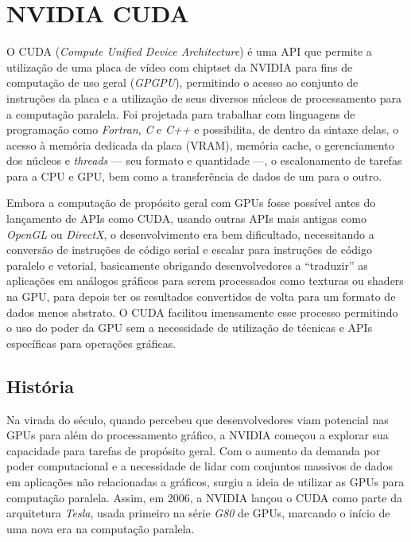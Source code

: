 \documentclass[12pt,
openright, 
oneside, %
a4paper,    %
brazil]{facom-ufu-abntex2}
\begin{document}

\section{NVIDIA CUDA}
\label{sec:cuda}

O CUDA (\textit{Compute Unified Device Architecture}) é uma API que permite a utilização de uma placa de vídeo com chiptset da NVIDIA para fins de computação de uso geral (\textit{GPGPU}), permitindo o acesso ao conjunto de instruções da placa e a utilização de seus diversos núcleos de processamento para a computação paralela. Foi projetada para trabalhar com linguagens de programação como \textit{Fortran}, \textit{C} e \textit{C++} e possibilita, de dentro da sintaxe delas, o acesso à memória dedicada da placa (VRAM), memória cache, o gerenciamento dos núcleos e \textit{threads} --- seu formato e quantidade ---, o escalonamento de tarefas para a CPU e GPU, bem como a transferência de dados de um para o outro.

Embora a computação de propósito geral com GPUs fosse possível antes do lançamento de APIs como CUDA, usando outras APIs mais antigas como \textit{OpenGL} ou \textit{DirectX}, o desenvolvimento era bem dificultado, necessitando a conversão de instruções de código serial e escalar para instruções de código paralelo e vetorial, basicamente obrigando desenvolvedores a \enquote{traduzir} as aplicações em análogos gráficos para serem processados como texturas ou shaders na GPU, para depois ter os resultados convertidos de volta para um formato de dados menos abstrato. O CUDA facilitou imensamente esse processo permitindo o uso do poder da GPU sem a necessidade de utilização de técnicas e APIs específicas para operações gráficas.


\subsection{História}
\label{ssc:históriaCUDA}

Na virada do século, quando percebeu que desenvolvedores viam potencial nas GPUs para além do processamento gráfico, a NVIDIA começou a explorar sua capacidade para tarefas de propósito geral. Com o aumento da demanda por poder computacional e a necessidade de lidar com conjuntos massivos de dados em aplicações não relacionadas a gráficos, surgiu a ideia de utilizar as GPUs para computação paralela. Assim, em 2006, a NVIDIA lançou o CUDA como parte da arquitetura \textit{Tesla}, usada primeiro na série \textit{G80} de GPUs, marcando o início de uma nova era na computação paralela.
\end{document}
